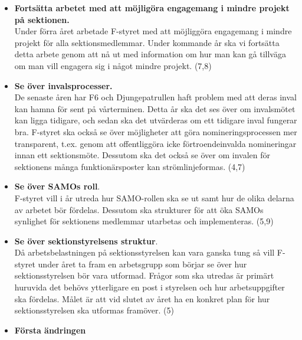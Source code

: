 \documentclass[a4paper]{article}
\begin{document}
\begin{itemize}
\item \textbf{Fortsätta arbetet med att möjligöra engagemang i mindre projekt på sektionen.}\\
Under förra året arbetade F-styret med att möjliggöra engagemang i mindre projekt för alla sektionsmedlemmar. Under kommande år ska vi fortsätta detta arbete genom att nå ut med information om hur man kan gå tillväga om man vill engagera sig i något mindre projekt. (7,8)


\item \textbf{Se över invalsprocesser.} \\
De senaste åren har F6 och Djungepatrullen haft problem med att deras inval kan hamna för sent på vårterminen. Detta år ska det ses över om invalsmötet kan ligga tidigare, och sedan ska det utvärderas om ett tidigare inval fungerar bra. F-styret ska också se över möjligheter att göra nomineringsprocessen mer transparent, t.ex. genom att offentliggöra icke förtroendeinvalda nomineringar innan ett sektionsmöte. Dessutom ska det också se över om invalen för sektionens många funktionärsposter kan strömlinjeformas. (4,7)%

\item \textbf{Se över SAMOs roll}.\\
F-styret vill i år utreda hur SAMO-rollen ska se ut samt hur de olika delarna av arbetet bör fördelas. Dessutom ska strukturer för att öka SAMOs synlighet för sektionens medlemmar utarbetas och implementeras. (5,9) %

\item \textbf{Se över sektionstyrelsens struktur}.\\
Då arbetsbelastningen på sektionsstyrelsen kan vara ganska tung så vill F-styret under året ta fram en arbetsgrupp som börjar se över hur sektionsstyrelsen bör vara utformad. Frågor som ska utredas är primärt huruvida det behövs ytterligare en post i styrelsen och hur arbetsuppgifter ska fördelas. Målet är att vid slutet av året ha en konkret plan för hur sektionsstyrelsen ska utformas framöver. (5)

\item \textbf{Första ändringen}



\end{itemize}
\end{document}
